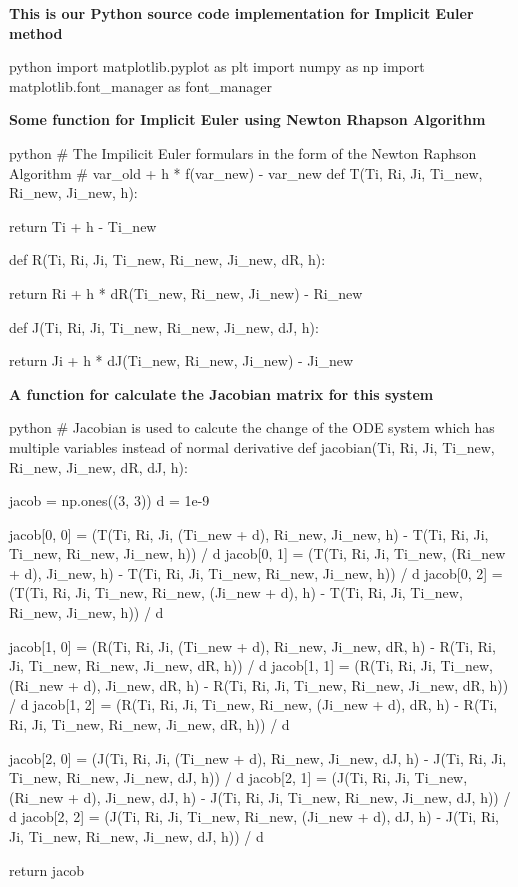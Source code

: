 \documentclass[a4paper]{article}
\begin{document}
\textbf{This is our Python source code implementation for Implicit Euler method}
\begin{code}{python}
import matplotlib.pyplot as plt
import numpy as np
import matplotlib.font_manager as font_manager
\end{code}
\textbf{Some function for Implicit Euler using Newton Rhapson Algorithm }
\begin{code}{python}
# The Impilicit Euler formulars in the form of the Newton Raphson Algorithm 
# var_old + h * f(var_new) - var_new
def T(Ti, Ri, Ji, Ti_new, Ri_new, Ji_new, h):

    return Ti + h - Ti_new


def R(Ti, Ri, Ji, Ti_new, Ri_new, Ji_new, dR, h):

    return Ri + h * dR(Ti_new, Ri_new, Ji_new) - Ri_new


def J(Ti, Ri, Ji, Ti_new, Ri_new, Ji_new, dJ, h):

    return Ji + h * dJ(Ti_new, Ri_new, Ji_new) - Ji_new
\end{code}
\textbf{A function for calculate the Jacobian matrix for this system}
\begin{code}{python}
# Jacobian is used to calcute the change of the ODE system which has multiple variables instead of normal derivative
def jacobian(Ti, Ri, Ji, Ti_new, Ri_new, Ji_new, dR, dJ, h):

    jacob = np.ones((3, 3))
    d = 1e-9

    jacob[0, 0] = (T(Ti, Ri, Ji, (Ti_new + d), Ri_new, Ji_new, h) - T(Ti, Ri, Ji, Ti_new, Ri_new, Ji_new, h)) / d
    jacob[0, 1] = (T(Ti, Ri, Ji, Ti_new, (Ri_new + d), Ji_new, h) - T(Ti, Ri, Ji, Ti_new, Ri_new, Ji_new, h)) / d
    jacob[0, 2] = (T(Ti, Ri, Ji, Ti_new, Ri_new, (Ji_new + d), h) - T(Ti, Ri, Ji, Ti_new, Ri_new, Ji_new, h)) / d

    jacob[1, 0] = (R(Ti, Ri, Ji, (Ti_new + d), Ri_new, Ji_new, dR, h) - R(Ti, Ri, Ji, Ti_new, Ri_new, Ji_new, dR, h)) / d
    jacob[1, 1] = (R(Ti, Ri, Ji, Ti_new, (Ri_new + d), Ji_new, dR, h) - R(Ti, Ri, Ji, Ti_new, Ri_new, Ji_new, dR, h)) / d
    jacob[1, 2] = (R(Ti, Ri, Ji, Ti_new, Ri_new, (Ji_new + d), dR, h) - R(Ti, Ri, Ji, Ti_new, Ri_new, Ji_new, dR, h)) / d

    jacob[2, 0] = (J(Ti, Ri, Ji, (Ti_new + d), Ri_new, Ji_new, dJ, h) - J(Ti, Ri, Ji, Ti_new, Ri_new, Ji_new, dJ, h)) / d
    jacob[2, 1] = (J(Ti, Ri, Ji, Ti_new, (Ri_new + d), Ji_new, dJ, h) - J(Ti, Ri, Ji, Ti_new, Ri_new, Ji_new, dJ, h)) / d
    jacob[2, 2] = (J(Ti, Ri, Ji, Ti_new, Ri_new, (Ji_new + d), dJ, h) - J(Ti, Ri, Ji, Ti_new, Ri_new, Ji_new, dJ, h)) / d

    return jacob
\end{code}
\end{document}
